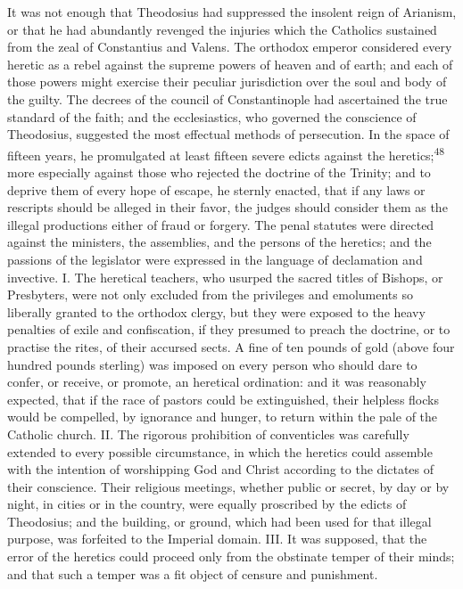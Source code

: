 It was not enough that Theodosius had suppressed the insolent
reign of Arianism, or that he had abundantly revenged the
injuries which the Catholics sustained from the zeal of
Constantius and Valens. The orthodox emperor considered every
heretic as a rebel against the supreme powers of heaven and of
earth; and each of those powers might exercise their peculiar
jurisdiction over the soul and body of the guilty. The decrees of
the council of Constantinople had ascertained the true standard
of the faith; and the ecclesiastics, who governed the conscience
of Theodosius, suggested the most effectual methods of
persecution. In the space of fifteen years, he promulgated at
least fifteen severe edicts against the heretics;\textsuperscript{48} more
especially against those who rejected the doctrine of the
Trinity; and to deprive them of every hope of escape, he sternly
enacted, that if any laws or rescripts should be alleged in their
favor, the judges should consider them as the illegal productions
either of fraud or forgery. The penal statutes were directed
against the ministers, the assemblies, and the persons of the
heretics; and the passions of the legislator were expressed in
the language of declamation and invective. I. The heretical
teachers, who usurped the sacred titles of Bishops, or
Presbyters, were not only excluded from the privileges and
emoluments so liberally granted to the orthodox clergy, but they
were exposed to the heavy penalties of exile and confiscation, if
they presumed to preach the doctrine, or to practise the rites,
of their accursed sects. A fine of ten pounds of gold (above four
hundred pounds sterling) was imposed on every person who should
dare to confer, or receive, or promote, an heretical ordination:
and it was reasonably expected, that if the race of pastors could
be extinguished, their helpless flocks would be compelled, by
ignorance and hunger, to return within the pale of the Catholic
church. II. The rigorous prohibition of conventicles was
carefully extended to every possible circumstance, in which the
heretics could assemble with the intention of worshipping God and
Christ according to the dictates of their conscience. Their
religious meetings, whether public or secret, by day or by night,
in cities or in the country, were equally proscribed by the
edicts of Theodosius; and the building, or ground, which had been
used for that illegal purpose, was forfeited to the Imperial
domain. III. It was supposed, that the error of the heretics
could proceed only from the obstinate temper of their minds; and
that such a temper was a fit object of censure and punishment.
